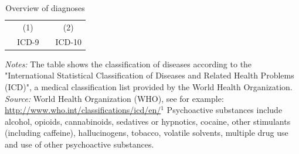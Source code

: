 \documentclass[11pt, a4paper]{article} %
\begin{document}
\begin{table}[h] %
	\begin{threeparttable}
		\centering %
		\caption{Overview of diagnoses} %
		\label{tab:outcomes_coding_main_chapters} 
		\begin{tabular}{lrrr} %
			\toprule %
			&\multicolumn{1}{c}{(1)}& &\multicolumn{1}{c}{(2)}\\
			&\multicolumn{1}{c}{ICD-9} & & \multicolumn{1}{c}{ICD-10} \\ 
			\midrule
			
			\bottomrule %
		\end{tabular}
		\begin{tablenotes}
			\scriptsize{ \item \textit{Notes:} The table shows the classification of diseases according to the "International Statistical Classification of Diseases and Related Health Problems (ICD)", a medical classification list provided by the World Health Organization. \newline \textit{Source:} World Health Organization (WHO), see for example: \href{http://www.who.int/classifications/icd/en/}{http://www.who.int/classifications/icd/en/}\newline$^1$ Psychoactive substances include alcohol, opioids, cannabinoids, sedatives or hypnotics, cocaine, other stimulants (including caffeine), hallucinogens, tobacco, volatile solvents,  multiple drug use and use of other psychoactive substances. }
		\end{tablenotes}
	\end{threeparttable}
\end{table}





\end{document}
